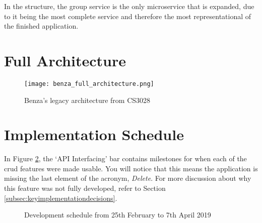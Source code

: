 \documentclass{article}
\begin{document}
     In the structure, the group service is the only microservice that is expanded, due to it being the most complete service and therefore the most representational of the finished application.
    
\newpage
\section{Full Architecture}
\label{app:fullarchitecture}
\begin{figure}[h!]
        \texttt{[image: benza\_full\_architecture.png]}
        \caption{Benza's legacy architecture from CS3028}
        \label{fig:full_architecture_diagram}
\end{figure}

\newpage
\section{Implementation Schedule}
\label{app:ganttchartimplementationschedule}

In Figure \ref{fig:ganttchartschedule2}, the `API Interfacing' bar contains milestones for when each of the \acrshort{crud} features were made usable. You will notice that this means the application is missing the last element of the acronym, \emph{Delete}. For more discussion about why this feature was not fully developed, refer to Section \ref{subsec:keyimplementationdecisions}. \par

\begin{figure}[ht]
        \centering
        \caption{Development schedule from 25th February to 7th April 2019}
        \label{fig:ganttchartschedule2}
    \end{figure}
    
\end{document}
